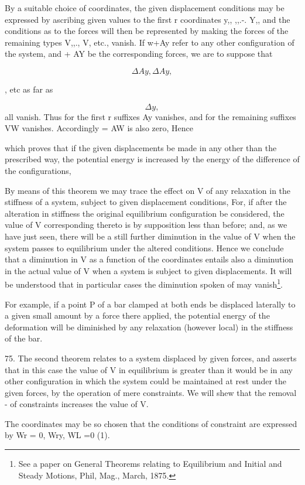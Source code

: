 By a suitable choice of coordinates, the given displacement conditions may be
expressed by ascribing given values to the first r coordinates y,, ,,.-. Y,,
and the conditions as to the forces will then be represented by making the
forces of the remaining types V,,., V, etc., vanish. If w+Ay refer to any other
configuration of the system, and + AY be the corresponding forces, we are to
suppose that

\[\Delta Ay, \Delta Ay,\]

, etc as far as

\[\Delta y,\]
 all vanish. Thus for the first r suffixes Ay vanishes, and for
the remaining suffixes VW vanishes. Accordingly = AW is also zero, Hence

which proves that if the given displacements be made in any other than the
prescribed way, the potential energy is increased by the energy of the
difference of the configurations,

By means of this theorem we may trace the effect on V of any relaxation in the
stiffness of a system, subject to given displacement conditions, For, if after
the alteration in stiffness the original equilibrium configuration be
considered, the value of V corresponding thereto is by supposition less than
before; and, as we have just seen, there will be a still further diminution in
the value of V when the system passes to equilibrium under the altered
conditions. Hence we conclude that a diminution in V as a function of the
coordinates entails also a diminution in the actual value of V when a system is
subject to given displacements. It will be understood that in particular cases
the diminution spoken of may vanish\footnote{See a paper on General Theorems
relating to Equilibrium and Initial and Steady Motions, Phil, Mag., March,
1875.}.

For example, if a point P of a bar clamped at both ends be displaced laterally
to a given small amount by a force there applied, the potential energy of the
deformation will be diminished by any relaxation (however local) in the
stiffness of the bar.

75. The second theorem relates to a system displaced by given forces, and
asserts that in this case the value of V in equilibrium is greater than it
would be in any other configuration in which the system could be maintained at
rest under the given forces, by the operation of mere constraints. We will shew
that the removal - of constraints increases the value of V.

The coordinates may be so chosen that the conditions of constraint are
expressed by Wr = 0, Wry, WL =0 (1).

